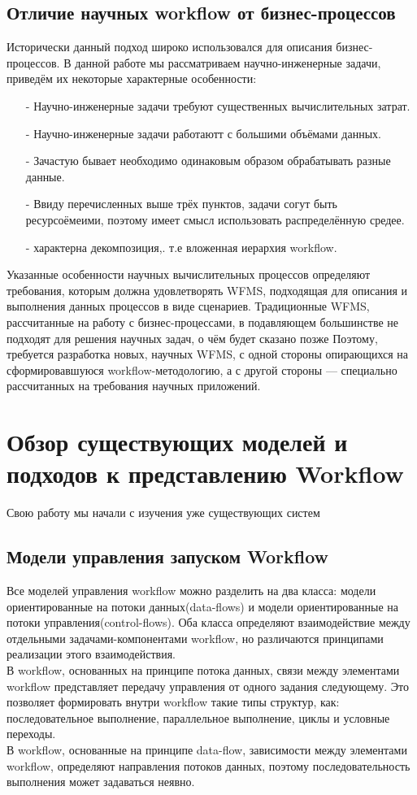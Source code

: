 \documentclass[a4paper,14pt]{article}
\begin{document}
\subsection*{Отличие научных workflow от бизнес-процессов}
  Исторически данный подход широко использовался для описания бизнес-процессов. В данной работе мы рассматриваем научно-инженерные задачи, приведём их некоторые характерные особенности:
 
\begin{enumerate}
\item[-] Научно-инженерные задачи требуют существенных вычислительных затрат.
\item[-] Научно-инженерные задачи работаютт с большими объёмами данных.
\item[-] Зачастую бывает  необходимо одинаковым образом обрабатывать разные данные.
\item[-]  Ввиду перечисленных выше трёх пунктов, задачи согут быть ресурсоёмеими, поэтому имеет смысл использовать распределённую средее.
\item[-]  характерна декомпозиция,. т.е вложенная иерархия workflow.
\end{enumerate}

Указанные особенности научных вычислительных процессов определяют требования, которым должна удовлетворять WFMS, подходящая для
описания и выполнения данных процессов в виде сценариев. Традиционные WFMS, рассчитанные на работу с бизнес-процессами, в подавляющем большинстве не подходят для решения научных задач, о чём будет сказано позже Поэтому, требуется разработка новых, научных WFMS, с одной стороны опирающихся на сформировавшуюся workflow-методологию, а с другой стороны — специально рассчитанных на требования научных приложений.

\section{Обзор существующих моделей и подходов к представлению Workflow}

Свою работу мы начали с изучения уже существующих систем
\subsection*{Модели управления запуском Workflow}
  Все моделей управления workflow можно разделить на два класса: модели ориентированные на потоки данных(data-flows) и модели ориентированные на потоки управления(control-flows). Оба класса определяют взаимодействие между отдельными задачами-компонентами workflow, но различаются принципами реализации этого взаимодействия.  \\
  В workflow, основанных на принципе потока данных, связи между элементами workflow  представляет передачу управления от одного задания следующему. Это позволяет формировать внутри workflow такие типы структур, как: последовательное выполнение, параллельное выполнение, циклы и условные переходы.\\ 
  В workflow, основанные на принципе data-flow, зависимости между элементами workflow, определяют направления потоков данных, поэтому последовательность выполнения может задаваться неявно.
 
\end{document}

